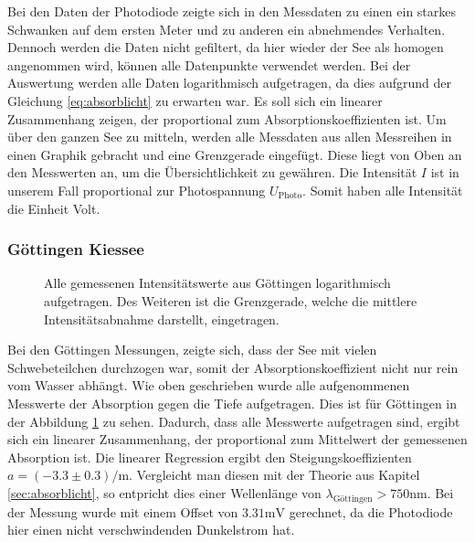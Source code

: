 \documentclass[12pt,a4paper,titlepage,headinclude,bibtotoc]{scrartcl}
\numberwithin{equation}{subsection}
\begin{document}
Bei den Daten der Photodiode zeigte sich in den Messdaten zu einen ein starkes Schwanken auf dem ersten Meter und zu anderen ein abnehmendes Verhalten.
Dennoch werden die Daten nicht gefiltert, da hier wieder der See als homogen angenommen wird, können alle Datenpunkte verwendet werden.
Bei der Auswertung werden alle Daten logarithmisch aufgetragen, da dies aufgrund der Gleichung \ref{eq:absorblicht} zu erwarten war. 
Es soll sich ein linearer Zusammenhang zeigen, der proportional zum Absorptionskoeffizienten ist.
Um über den ganzen See zu mitteln, werden alle Messdaten aus allen Messreihen in einen Graphik gebracht und eine Grenzgerade eingefügt.
Diese liegt von Oben an den Messwerten an, um die Übersichtlichkeit zu gewähren.
Die Intensität $I$ ist in unserem Fall proportional zur Photospannung $U_\text{Photo}$.
Somit haben alle Intensität die Einheit Volt.

\subsubsection{Göttingen Kiessee}
\begin{figure}[!htb]
	\centering
	
	\caption{Alle gemessenen Intensitätswerte aus Göttingen logarithmisch aufgetragen. Des Weiteren ist die Grenzgerade, welche die mittlere Intensitätsabnahme darstellt, eingetragen.}
	\label{fig:lichtGoe}
\end{figure}
Bei den Göttingen Messungen, zeigte sich, dass der See mit vielen Schwebeteilchen durchzogen war, somit der Absorptionskoeffizient nicht nur rein vom Wasser abhängt.
Wie oben geschrieben wurde alle aufgenommenen Messwerte der Absorption gegen die Tiefe aufgetragen.
Dies ist für Göttingen in der Abbildung \ref{fig:lichtGoe} zu sehen.
Dadurch, dass alle Messwerte aufgetragen sind, ergibt sich ein linearer Zusammenhang, der proportional zum Mittelwert der gemessenen Absorption ist.
Die linearer Regression ergibt den Steigungskoeffizienten $a=(-3.3\pm0.3)\si{\per\meter}$.
Vergleicht man diesen mit der Theorie aus Kapitel \ref{sec:absorblicht}, so entpricht dies einer Wellenlänge von $\lambda_\text{Göttingen}>750\si{\nano\meter}$.
Bei der Messung wurde mit einem Offset von $3.31\si{\milli\volt}$ gerechnet, da die Photodiode hier einen nicht verschwindenden Dunkelstrom hat.
\end{document}
